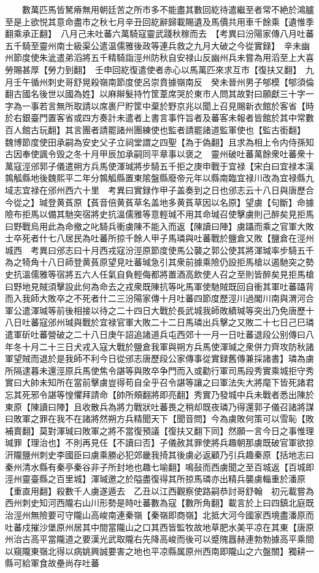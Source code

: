 　　數萬匹馬皆駑瘠無用朝廷苦之所市多不能盡其數回紇待遣繼至者常不絶於鴻臚至是上欲悦其意命盡市之秋七月辛丑回紇辭歸載賜遺及馬價共用車千餘乘【遺惟季翻乘承正翻】　八月己未吐蕃六萬騎寇靈武踐秋稼而去　【考異曰汾陽家傳八月吐蕃五千騎至靈州南士級渠公遣温儒雅後政等連兵救之九月大破之今從實録】　辛未幽州節度使朱泚遣弟滔將五千精騎詣涇州防秋自安禄山反幽州兵未嘗為用滔至上大喜勞賜甚厚【勞力到翻】　壬申回紇復遣使者赤心以馬萬匹來求互市【復扶又翻】　九月壬午循州刺史哥舒晃殺嶺南節度使呂崇賁據嶺南反　癸未晉州男子郇模【郇須倫翻古國名後世以國為姓】以麻辮髮持竹筐葦席哭於東市人問其故對曰願獻三十字一字為一事若言無所取請以席裹尸貯筐中棄於野京兆以聞上召見賜新衣館於客省【時於右銀臺門置客省或四方奏計未遣者上書言事忤旨者及蕃客未報者皆館於其中常數百人館古玩翻】其言團者請罷諸州團練使也監者請罷諸道監軍使也【監古銜翻】　魏博節度使田承嗣為安史父子立祠堂謂之四聖【為于偽翻】且求為相上令内侍孫知古因奉使諷令毁之冬十月甲辰加承嗣同平章事以褒之　靈州破吐蕃萬餘衆吐蕃衆十萬寇涇邠郭子儀遣朔方兵馬使渾瑊將步騎五千拒之庚申戰于宜禄【宋白曰宜禄本漢鶉觚縣地後魏熙平二年分鶉觚縣置東隂盤縣廢帝元年以縣南臨宜禄川改為宜禄縣九域志宜禄在邠州西六十里　考異曰實録作甲子盖奏到之日也邠志云十八日與唐歷合今從之】瑊登黄萯原【萯音倍黄萯草名盖地多黄萯草因以名原】望虜【句斷】命據險布拒馬以備其馳突宿將史抗溫儒雅等意輕瑊不用其命瑊召使擊虜則己醉矣見拒馬曰野戰烏用此為命撤之叱騎兵衝虜陳不能入而返【陳讀曰陣】虜躡而乘之官軍大敗士卒死者什七八居民為吐蕃所掠千餘人甲子馬璘與吐蕃戰於鹽倉又敗【鹽倉在涇州城西　考異曰邠志曰十月西戎寇汾涇原節度使馬公襲之郭公使其將渾瑊率步騎五千為之犄角十八日師登黄萯原望見吐蕃瑊急引其衆前據乘險仍設拒馬槍以遏馳突之勢史抗溫儒雅等宿將五六人任氣自負輕侮都將置酒高飲使人召之至則皆醉矣見拒馬槍曰野地見賊須擊設此何為命去之戎衆既陳抗等叱馬軍使馳賊既回自衝其軍吐蕃躡背而入我師大敗卒之不死者什二三汾陽家傳十月吐蕃四節度歷涇川過閣川南與渭河合軍公遣渾瑊等前後相接以待之二十四日大戰於長武城我師敗績瑊等突出乃免唐歷十八日吐蕃寇邠州瑊與戰於宜禄官軍大敗二十二日馬璘出兵擊之又敗二十七日己巳璘遣軍斫吐蕃營破之二十八日庚午詔追諸道兵屯西郊十一月一日吐蕃退段公别傳曰八年冬十月二十三日犬戎入寇大戰於鹽倉我軍與朔方兵馬使渾瑊之衆併力齊攻防秋諸軍望賊而退於是我師不利今日從邠志唐歷段公家傳事從實録舊傳兼採諸書】璘為虜所隔逮暮未還涇原兵馬使焦令諶等與敗卒争門而入或勸行軍司馬段秀實乘城拒守秀實曰大帥未知所在當前擊虜豈得苟自全乎召令諶等讓之曰軍法失大將麾下皆死諸君忘其死邪令諶等惶懼拜請命【帥所頰翻將即亮翻】秀實乃發城中兵未戰者悉出陳於東原【陳讀曰陣】且收散兵為將力戰狀吐蕃畏之稍却既夜璘乃得還郭子儀召諸將謀曰敗軍之罪在我不在諸將然朔方兵精聞天下【聞音問】今為虜敗何策可以雪恥【敗補賣翻】莫對渾瑊曰敗軍之將不當復預議【復扶又翻下同】然願一言今日之事惟理瑊罪【理治也】不則再見任【不讀曰否】子儀赦其罪使將兵趣朝那虜既破官軍欲掠汧隴鹽州刺史李國臣曰虜乘勝必犯郊畿我掎其後虜必返顧乃引兵趣秦原【括地志曰秦州清水縣有秦亭秦谷非子所封地也趣七喻翻】鳴鼔而西虜聞之至百城返【百城即涇州靈臺縣之百里城】渾瑊邀之於隘盡復得其所掠馬璘亦出精兵襲虜輜重於潘原【重直用翻】殺數千人虜遂遁去　乙丑以江西觀察使路嗣恭討哥舒翰　初元載嘗為西州刺史知河西隴右山川形勢是時吐蕃數為寇【數所角翻】載言於上曰四鎮北庭既治涇州無險要可守隴山高峻南連秦嶺【秦嶺即商嶺】北抵大河今國家西境盡潘原而吐蕃戍摧沙堡原州居其中間當隴山之口其西皆監牧故地草肥水美平凉在其東【唐原州治古高平當隴道之要漢光武取隴右先降高峻而後可以蹙隗囂赫連勃勃據高平乘間以窺隴東嶺北得以病姚興誠要害之地也平凉縣属原州西南即隴山之六盤關】獨耕一縣可給軍食故壘尚存吐蕃